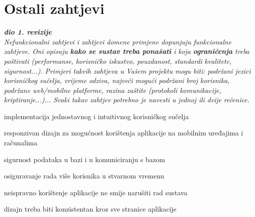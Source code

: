 		\section{Ostali zahtjevi}
		
			\textbf{\textit{dio 1. revizije}}\\
		 
			 \textit{Nefunkcionalni zahtjevi i zahtjevi domene primjene dopunjuju funkcionalne zahtjeve. Oni opisuju \textbf{kako se sustav treba ponašati} i koja \textbf{ograničenja} treba poštivati (performanse, korisničko iskustvo, pouzdanost, standardi kvalitete, sigurnost...). Primjeri takvih zahtjeva u Vašem projektu mogu biti: podržani jezici korisničkog sučelja, vrijeme odziva, najveći mogući podržani broj korisnika, podržane web/mobilne platforme, razina zaštite (protokoli komunikacije, kriptiranje...)... Svaki takav zahtjev potrebno je navesti u jednoj ili dvije rečenice.}

			 \begin{packed_item}
				\item implementacija jednostavnog i intuitivnog korisničkog sučelja
				\item responzivan dizajn za mogućnost korištenja aplikacije na mobilnim uređajima i računalima
				\item sigurnost podataka u bazi i u komuniciranju s bazom
				\item osiguravanje rada više korisnika u stvarnom vremenu
				\item neispravno korištenje aplikacije ne smije narušiti rad sustava
				\item dizajn treba biti konzistentan kroz sve stranice aplikacije
			\end{packed_item}


			 
			 
			 
	
